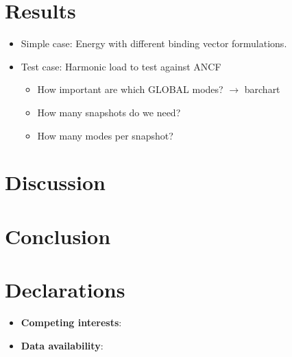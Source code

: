 \documentclass[pdflatex,sn-mathphys-num]{sn-jnl}
\begin{document}
\section{Results}
\label{Results}
\begin{itemize}
	\item Simple case: Energy with different binding vector formulations.
	\item Test case: Harmonic load to test against ANCF
	\begin{itemize}
		\item How important are which GLOBAL modes? $\rightarrow$ barchart
		\item How many snapshots do we need?
		\item How many modes per snapshot?
	\end{itemize}
\end{itemize}

\section{Discussion}
\label{Discussion}

\section{Conclusion}
\label{Conclusion}

\backmatter
{}



\section*{Declarations}
\begin{itemize}
	\item \textbf{Competing interests}:
	\item \textbf{Data availability}: 
\end{itemize}

\newpage
\begin{appendices}

\end{appendices}

\end{document}
